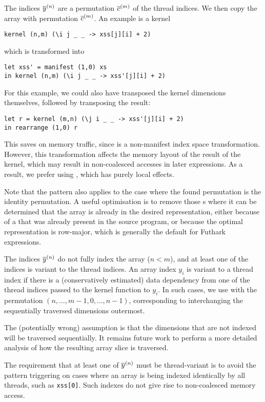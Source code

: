 \begin{description}[style=nextline]
\item[Complete Index]

  The indices $\overline{y}^{(n)}$ are a permutation $\overline{c}^{(m)}$ of the
  thread indices.  We then copy the array with permutation
  $\overline{c}^{(m)}$.  An example is a kernel
\begin{lstlisting}[numbers=none]
kernel (n,m) (\i j _ _ -> xss[j][i] + 2)
\end{lstlisting}
which is transformed into
\begin{lstlisting}[numbers=none]
let xss' = manifest (1,0) xs
in kernel (n,m) (\i j _ _ -> xss'[j][i] + 2)
\end{lstlisting}

For this example, we could also have transposed the kernel dimensions
themselves, followed by transposing the result:
\begin{lstlisting}[numbers=none]
let r = kernel (m,n) (\j i _ _ -> xss'[j][i] + 2)
in rearrange (1,0) r
\end{lstlisting}
This saves on memory traffic, since  is a non-manifest
index space transformation.  However, this transformation affects the
memory layout of the result of the kernel, which may result in
non-coalesced accesses in later expressions.  As a result, we prefer
using , which has purely local effects.

Note that the pattern also applies to the case where the found
permutation is the identity permutation.  A useful optimisation is to
remove those s where it can be determined that the array
is already in the desired representation, either because of a
 that was already present in the source program, or
because the optimal representation is row-major, which is generally
the default for Futhark expressions.

\item[Incomplete Index]

  The indices $\overline{y}^{(n)}$ do not fully index the array ($n<m$), and
  at least one of the indices is variant to the thread indices.  An
  array index $y_{i}$ is variant to a thread index if there is a
  (conservatively estimated) data dependency from one of the thread
  indices passed to the kernel function to $y_{i}$.  In such cases, we
  use  with the permutation
  $(n,\ldots,m-1,0,\ldots,n-1)$, corresponding to interchanging the
  sequentially traversed dimensions outermost.

  The (potentially wrong) assumption is that the dimensions that are
  not indexed will be traversed sequentially.  It remains future work
  to perform a more detailed analysis of how the resulting array slice
  is traversed.

  The requirement that at least one of $\overline{y}^{(n)}$ must be
  thread-variant is to avoid the pattern triggering on cases where an
  array is being indexed identically by all threads, such as
  \lstinline{xss[0]}.  Such indexes do not give rise to non-coalesced
  memory access.
\end{description}

